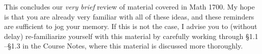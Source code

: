 \documentclass[11pt,fleqn,dvipsnames,usenames]{article}
\newcommand{\p}{\noindent}
\begin{document}
\p This concludes our \emph{very brief} review of material covered in Math 1700.  My hope is that you are already very familiar with all of these ideas, and these reminders are sufficient to jog your memory.  If this is not the case, I advise you to (without delay) re-familiarize yourself with this material by carefully working through \S 1.1 \nolinebreak --\nolinebreak  \S 1.3 in the Course Notes, where this material is discussed more thoroughly.
\end{document}

